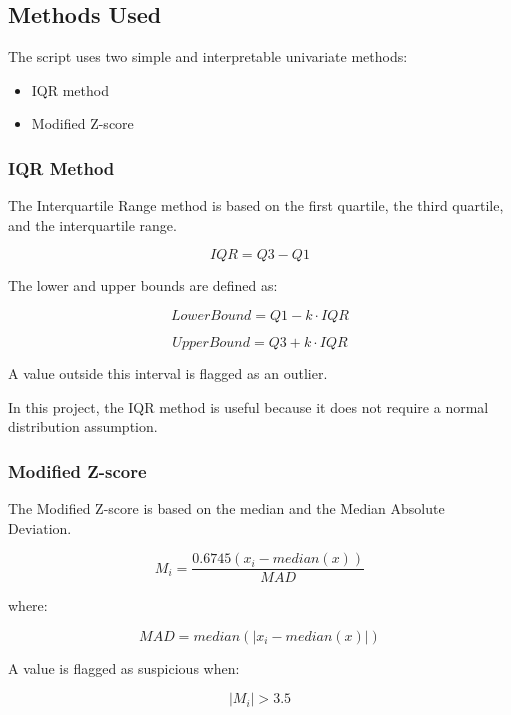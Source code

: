 \documentclass[a4paper,11pt]{article}
\begin{document}
	\subsection{Methods Used}
	
	The script uses two simple and interpretable univariate methods:
	
	\begin{itemize}[leftmargin=1.2cm]
		\item IQR method
		\item Modified Z-score
	\end{itemize}
	
	
	\subsubsection{IQR Method}
	
	The Interquartile Range method is based on the first quartile, the third quartile, and the interquartile range.
	
	\[
	IQR = Q3 - Q1
	\]
	
	The lower and upper bounds are defined as:
	
	\[
	LowerBound = Q1 - k \cdot IQR
	\]
	
	\[
	UpperBound = Q3 + k \cdot IQR
	\]
	
	A value outside this interval is flagged as an outlier.
	
	In this project, the IQR method is useful because it does not require a normal distribution assumption.
	
	\subsubsection{Modified Z-score}
	
	The Modified Z-score is based on the median and the Median Absolute Deviation.
	
	\[
	M_i = \frac{0.6745(x_i - median(x))}{MAD}
	\]
	
	where:
	
	\[
	MAD = median(|x_i - median(x)|)
	\]
	
	A value is flagged as suspicious when:
	
	\[
	|M_i| > 3.5
	\]
	
\end{document}
